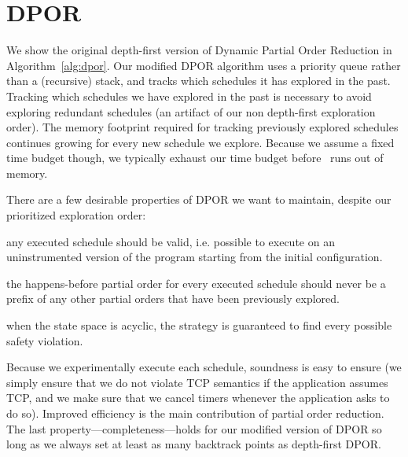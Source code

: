 
\section{DPOR}
\label{app:dpor}

We show the original depth-first version of Dynamic Partial Order Reduction
in Algorithm~\ref{alg:dpor}. Our modified DPOR algorithm uses a priority queue
rather than a (recursive) stack, and tracks which schedules it has explored
in the past. Tracking which schedules we have explored in the past is
necessary to avoid exploring redundant schedules (an artifact of our non depth-first
exploration order). The memory footprint required for tracking previously explored
schedules continues growing for every new schedule we explore. Because we
assume a fixed time budget though,
we typically exhaust our time budget before \sys~runs out of memory.

There are a few desirable properties of DPOR we want to maintain,
despite our prioritized exploration order:

 any executed schedule should be valid, i.e. possible
to execute on an uninstrumented version of the program starting from the
initial configuration.

 the happens-before partial order for every executed schedule
should never be a prefix of any other partial orders that have been
previously explored.

 when the state space is acyclic, the strategy is guaranteed to
find every possible safety violation.

Because we experimentally execute each schedule, soundness is easy to
ensure (we simply ensure that we do not violate TCP semantics if the application
assumes TCP, and we make sure that
we cancel timers whenever the application asks to do so).
Improved efficiency is the main contribution of partial order reduction. The last
property---completeness---holds for our modified version of DPOR so long as we
always set at least as many backtrack points as depth-first
DPOR.

